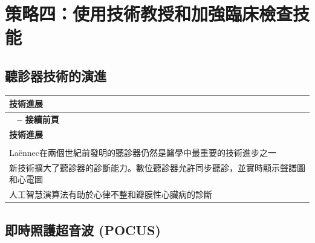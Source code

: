 \documentclass[12pt,a4paper]{article}
\begin{document}
\section{策略四：使用技術教授和加強臨床檢查技能}

\subsection{聽診器技術的演進}

\begin{longtable}{>{\raggedright\arraybackslash}p{15cm}}
\toprule
\textbf{\textcolor{emergency_blue}{技術進展}} \\
\midrule
\endfirsthead

\multicolumn{1}{c}%
{{\bfseries \tablename\ \thetable{} -- 接續前頁}} \\
\toprule
\textbf{\textcolor{emergency_blue}{技術進展}} \\
\midrule
\endhead

\midrule \multicolumn{1}{r}{{接續下頁}} \\ \midrule
\endfoot

\bottomrule
\endlastfoot

Laënnec在兩個世紀前發明的聽診器仍然是醫學中最重要的技術進步之一 \\

新技術擴大了聽診器的診斷能力。數位聽診器允許同步聽診，並實時顯示聲譜圖和心電圖 \\

人工智慧演算法有助於心律不整和瓣膜性心臟病的診斷 \\
\end{longtable}

\subsection{即時照護超音波 (POCUS)}
\end{document}
